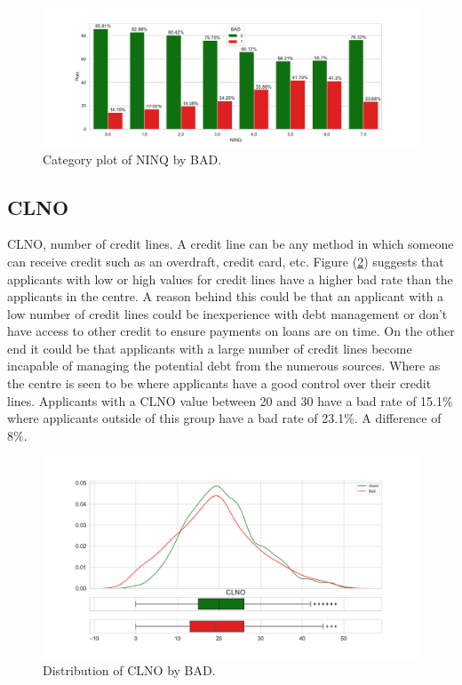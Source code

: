 \begin{figure}[H]
	\centering
	\includegraphics[scale=0.40]{figs/ninq_cat.pdf}
	\caption{Category plot of NINQ by BAD. \label{ninq_cat}}
\end{figure}

\subsection*{CLNO}

CLNO, number of credit lines. A credit line can be any method in which someone can receive credit such as an overdraft, credit card, etc. Figure (\ref{clno_dist}) suggests that applicants with low or high values for credit lines have a higher bad rate than the applicants in the centre. A reason behind this could be that an applicant with a low number of credit lines could be inexperience with debt management or don't have access to other credit to ensure payments on loans are on time. On the other end it could be that applicants with a large number of credit lines become incapable of managing the potential debt from the numerous sources. Where as the centre is seen to be where applicants have a good control over their credit lines. Applicants with a CLNO value between 20 and 30 have a bad rate of 15.1\% where applicants outside of this group have a bad rate of 23.1\%. A difference of 8\%.

\begin{figure}[H]
	\centering
	\includegraphics[scale=0.40]{figs/clno_dist.pdf}
	\caption{Distribution of CLNO by BAD. \label{clno_dist}}
\end{figure}

